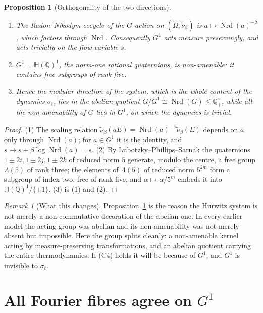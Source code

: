 \documentclass[11pt]{amsart}
\numberwithin{equation}{section}
\newtheorem{proposition}[theorem]{Proposition}
\theoremstyle{definition}
\theoremstyle{remark}
\newtheorem{remark}[theorem]{Remark}
\newcommand{\Q}{\mathbb{Q}}
\newcommand{\HH}{\mathbb{H}}
\newcommand{\Nrd}{\operatorname{Nrd}}
\begin{document}
\begin{proposition}[Orthogonality of the two directions]\label{prop:orthogonal}
\begin{enumerate}
\item The Radon--Nikodym cocycle of the $G$-action on $(\widetilde\Omega,\tilde\nu_\beta)$ is
$a\mapsto\Nrd(a)^{-\beta}$, which factors through $\Nrd$. Consequently $G^1$ acts
\emph{measure preservingly}, and acts trivially on the flow variable $s$.
\item $G^1=\HH(\Q)^1$, the norm-one rational quaternions, is non-amenable: it contains
free subgroups of rank five.
\item Hence the modular direction of the system, which is the whole content of the dynamics
$\sigma_t$, lies in the abelian quotient $G/G^1\cong\Nrd(G)\le\Q^\times_+$, while all the
non-amenability of $G$ lies in $G^1$, on which the dynamics is trivial.
\end{enumerate}
\end{proposition}

\begin{proof}
(1) The scaling relation $\tilde\nu_\beta(aE)=\Nrd(a)^{-\beta}\tilde\nu_\beta(E)$ depends on
$a$ only through $\Nrd(a)$; for $a\in G^1$ it is the identity, and
$s\mapsto s+\beta\log\Nrd(a)=s$. (2) By Lubotzky--Phillips--Sarnak \cite[\S3]{LPS} the
quaternions $1\pm2i,1\pm2j,1\pm2k$ of reduced norm $5$ generate, modulo the centre, a free
group $\Lambda(5)$ of rank three; the elements of $\Lambda(5)$ of reduced norm $5^{2m}$ form
a subgroup of index two, free of rank five, and $\alpha\mapsto\alpha/5^m$ embeds it into
$\HH(\Q)^1/\{\pm1\}$. (3) is (1) and (2).
\end{proof}

\begin{remark}[What this changes]\label{rem:changes}
Proposition~\ref{prop:orthogonal} is the reason the Hurwitz system is not merely a
non-commutative decoration of the abelian one. In every earlier model the acting group was
abelian and its non-amenability was not merely absent but impossible. Here the group splits
cleanly: a non-amenable kernel acting by measure-preserving transformations, and an abelian
quotient carrying the entire thermodynamics. If (C4) holds it will be because of $G^1$, and
$G^1$ is invisible to $\sigma_t$.
\end{remark}

\section{All Fourier fibres agree on $G^1$}
\end{document}
